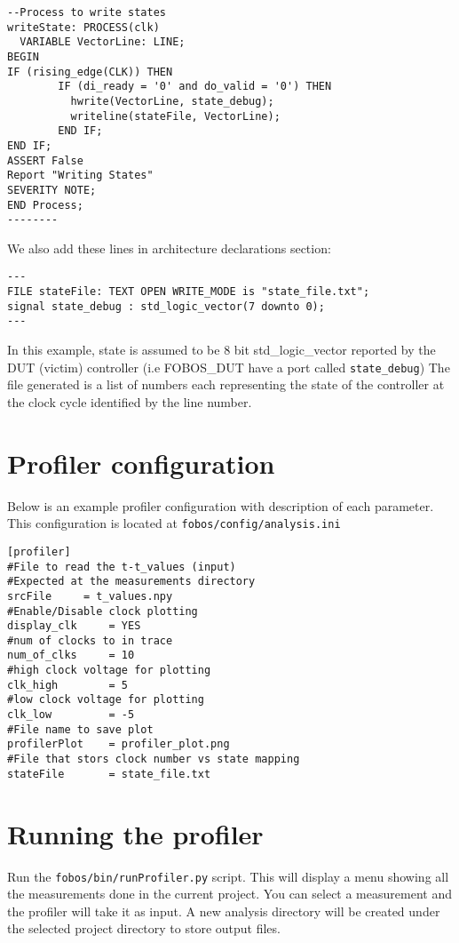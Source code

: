 \begin{verbatim}
--Process to write states 
writeState: PROCESS(clk)
  VARIABLE VectorLine: LINE;
BEGIN
IF (rising_edge(CLK)) THEN
        IF (di_ready = '0' and do_valid = '0') THEN
          hwrite(VectorLine, state_debug);  
          writeline(stateFile, VectorLine);	 
        END IF;
END IF;
ASSERT False
Report "Writing States"
SEVERITY NOTE;
END Process;
--------
\end{verbatim}

We also add these lines in architecture declarations section:

\begin{verbatim}
---
FILE stateFile: TEXT OPEN WRITE_MODE is "state_file.txt";
signal state_debug : std_logic_vector(7 downto 0);
---
\end{verbatim}

In this example, state is assumed to be 8 bit std\_logic\_vector reported by the DUT (victim) controller (i.e FOBOS\_DUT have a port called \texttt{state\_debug})
The file generated is a list of numbers each representing the state of the controller at the clock cycle identified by the line number.

\section{Profiler configuration}

Below is an example profiler configuration with description of each parameter.
This configuration is located at \texttt{fobos/config/analysis.ini}
\begin{verbatim}
[profiler]
#File to read the t-t_values (input)
#Expected at the measurements directory
srcFile     = t_values.npy
#Enable/Disable clock plotting
display_clk     = YES 
#num of clocks to in trace
num_of_clks     = 10  
#high clock voltage for plotting
clk_high        = 5   
#low clock voltage for plotting
clk_low         = -5  
#File name to save plot
profilerPlot    = profiler_plot.png
#File that stors clock number vs state mapping
stateFile       = state_file.txt
\end{verbatim}

\section{Running the profiler}

Run the \texttt{fobos/bin/runProfiler.py} script.
This will display a menu showing all the measurements done in the current project.
You can select a measurement and the profiler will take it as input. A new analysis directory will be created under the selected project directory to store output files.



